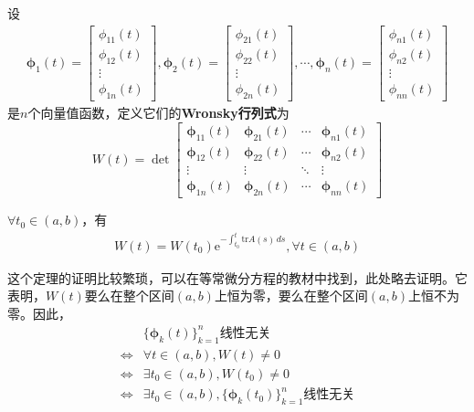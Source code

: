 \documentclass{ctexbook}
\begin{document}
\begin{definition}[Wronsky行列式]
    设\begin{align*}
    \boldsymbol{\phi}_1(t)=\begin{bmatrix}
    \phi_{11}(t)\\
    \phi_{12}(t)\\
    \vdots\\
    \phi_{1n}(t)
    \end{bmatrix},\boldsymbol{\phi}_2(t)=\begin{bmatrix}
    \phi_{21}(t)\\
    \phi_{22}(t)\\
    \vdots\\
    \phi_{2n}(t)
    \end{bmatrix},\cdots,\boldsymbol{\phi}_n(t)=\begin{bmatrix}
    \phi_{n1}(t)\\
    \phi_{n2}(t)\\
    \vdots\\
    \phi_{nn}(t)
    \end{bmatrix}
    \end{align*}
    是$n$个向量值函数，定义它们的\textbf{Wronsky行列式}为
    \[W(t)=\det\begin{bmatrix}
    \boldsymbol{\phi}_{11}(t) & \boldsymbol{\phi}_{21}(t) & \cdots & \boldsymbol{\phi}_{n1}(t)\\
    \boldsymbol{\phi}_{12}(t) & \boldsymbol{\phi}_{22}(t) & \cdots & \boldsymbol{\phi}_{n2}(t)\\
    \vdots & \vdots & \ddots & \vdots\\
    \boldsymbol{\phi}_{1n}(t) & \boldsymbol{\phi}_{2n}(t) & \cdots & \boldsymbol{\phi}_{nn}(t)
    \end{bmatrix}\]
\end{definition}

\begin{theorem}[Liouville公式]
    $\forall t_0\in (a,b)$，有
    \begin{align*}
        W(t)=W(t_0)\mathrm{e}^{-\int_{t_0}^t \mathrm{tr}A(s)\,ds},\forall t\in(a,b)
    \end{align*}
\end{theorem}

这个定理的证明比较繁琐，可以在\cite{ode}等常微分方程的教材中找到，此处略去证明。它表明，$W(t)$要么在整个区间$(a,b)$上恒为零，要么在整个区间$(a,b)$上恒不为零。因此，\begin{align*}
    &\{\boldsymbol{\phi}_k(t)\}_{k=1}^n\text{线性无关}\\
    \iff& \forall t\in(a,b),W(t)\neq 0\\
    \iff& \exists t_0\in(a,b),W(t_0)\neq 0\\
    \iff& \exists t_0\in(a,b),\{\boldsymbol{\phi}_k(t_0)\}_{k=1}^n\text{线性无关}
\end{align*}
\end{document}
